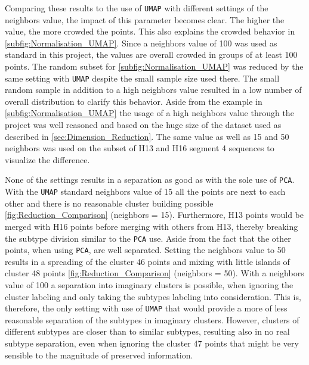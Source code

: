 \vspace{1em}

Comparing these results to the use of \texttt{UMAP} with different settings of the neighbors value, the impact of this parameter becomes clear. The higher the value, the more crowded the points. This also explains the crowded behavior in \autoref{subfig:Normalisation_UMAP}. Since a neighbors value of 100 was used as standard in this project, the values are overall crowded in groups of at least 100 points. The random subset for \autoref{subfig:Normalisation_UMAP} was reduced by the same setting with \texttt{UMAP} despite the small sample size used there. The small random sample in addition to a high neighbors value resulted in a low number of overall distribution to clarify this behavior. Aside from the example in \autoref{subfig:Normalisation_UMAP} the usage of a high neighbors value through the project was well reasoned and based on the huge size of the dataset used as described in \autoref{sec:Dimension_Reduction}. The same value as well as 15 and 50 neighbors was used on the subset of H13 and H16 segment 4 sequences to visualize the difference. 

\vspace{1em}

None of the settings results in a separation as good as with the sole use of \texttt{PCA}. With the \texttt{UMAP} standard neighbors value of 15 all the points are next to each other and there is no reasonable cluster building possible \autoref{fig:Reduction_Comparison} (neighbors = 15). Furthermore, H13 points would be merged with H16 points before merging with others from H13, thereby breaking the subtype division similar to the \texttt{PCA} use. Aside from the fact that the other points, when using \texttt{PCA}, are well separated. Setting the neighbors value to 50 results in a spreading of the cluster 46 points and mixing with little islands of cluster 48 points \autoref{fig:Reduction_Comparison} (neighbors = 50). With a neighbors value of 100 a separation into imaginary clusters is possible, when ignoring the cluster labeling and only taking the subtypes labeling into consideration. This is, therefore, the only setting with use of \texttt{UMAP} that would provide a more of less reasonable separation of the subtypes in imaginary clusters. However, clusters of different subtypes are closer than to similar subtypes, resulting also in no real subtype separation, even when ignoring the cluster 47 points that might be very sensible to the magnitude of preserved information.

